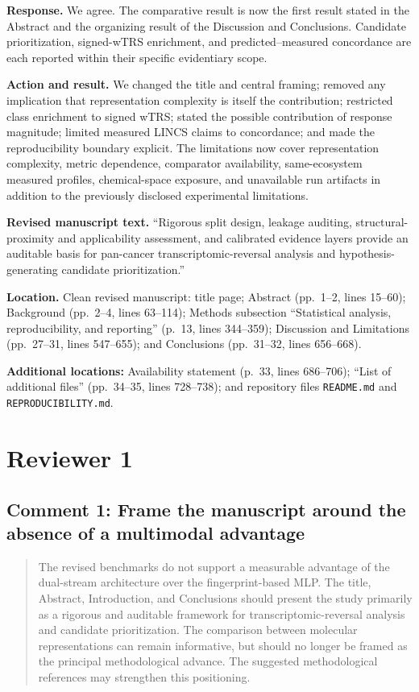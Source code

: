 \documentclass[10pt]{article}
\newenvironment{reviewcomment}{%
  \begin{quote}\small\itshape\color{black}
}{\end{quote}}
\newcommand{\Response}{\textbf{Response.} }
\newcommand{\Action}{\textbf{Action and result.} }
\newcommand{\RevisedText}{\textbf{Revised manuscript text.} }
\newcommand{\Location}{\textbf{Location.} }
\newcommand{\qtext}[1]{``#1''}
\begin{document}
\Response We agree. The comparative result is now the first result stated in the Abstract and the organizing result of the Discussion and Conclusions. Candidate prioritization, signed-wTRS enrichment, and predicted--measured concordance are each reported within their specific evidentiary scope.

\Action We changed the title and central framing; removed any implication that representation complexity is itself the contribution; restricted class enrichment to signed wTRS; stated the possible contribution of response magnitude; limited measured LINCS claims to concordance; and made the reproducibility boundary explicit. The limitations now cover representation complexity, metric dependence, comparator availability, same-ecosystem measured profiles, chemical-space exposure, and unavailable run artifacts in addition to the previously disclosed experimental limitations.

\RevisedText \qtext{Rigorous split design, leakage auditing, structural-proximity and applicability assessment, and calibrated evidence layers provide an auditable basis for pan-cancer transcriptomic-reversal analysis and hypothesis-generating candidate prioritization.}

\Location Clean revised manuscript: title page; Abstract (pp.~1--2, lines 15--60); Background (pp.~2--4, lines 63--114); Methods subsection ``Statistical analysis, reproducibility, and reporting'' (p.~13, lines 344--359); Discussion and Limitations (pp.~27--31, lines 547--655); and Conclusions (pp.~31--32, lines 656--668).

\noindent\textbf{Additional locations:} Availability statement (p.~33, lines 686--706); ``List of additional files'' (pp.~34--35, lines 728--738); and repository files \texttt{README.md} and \texttt{REPRODUCIBILITY.md}.

\clearpage
\section*{Reviewer 1}

\subsection*{Comment 1: Frame the manuscript around the absence of a multimodal advantage}

\begin{reviewcomment}
The revised benchmarks do not support a measurable advantage of the dual-stream architecture over the fingerprint-based MLP. The title, Abstract, Introduction, and Conclusions should present the study primarily as a rigorous and auditable framework for transcriptomic-reversal analysis and candidate prioritization. The comparison between molecular representations can remain informative, but should no longer be framed as the principal methodological advance. The suggested methodological references may strengthen this positioning.
\end{reviewcomment}
\end{document}
